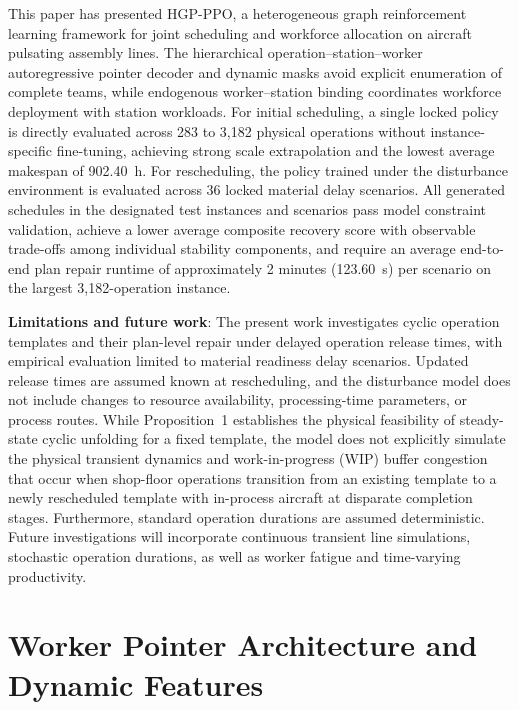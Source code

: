 \documentclass[journal,10pt]{IEEEtran}
\begin{document}
This paper has presented HGP-PPO, a heterogeneous graph reinforcement learning framework for joint scheduling and workforce allocation on aircraft pulsating assembly lines. The hierarchical operation--station--worker autoregressive pointer decoder and dynamic masks avoid explicit enumeration of complete teams, while endogenous worker--station binding coordinates workforce deployment with station workloads. For initial scheduling, a single locked policy is directly evaluated across 283 to 3,182 physical operations without instance-specific fine-tuning, achieving strong scale extrapolation and the lowest average makespan of 902.40~h. For rescheduling, the policy trained under the disturbance environment is evaluated across 36 locked material delay scenarios. All generated schedules in the designated test instances and scenarios pass model constraint validation, achieve a lower average composite recovery score with observable trade-offs among individual stability components, and require an average end-to-end plan repair runtime of approximately 2 minutes (123.60~s) per scenario on the largest 3,182-operation instance.

\textbf{Limitations and future work}: The present work investigates cyclic operation templates and their plan-level repair under delayed operation release times, with empirical evaluation limited to material readiness delay scenarios. Updated release times are assumed known at rescheduling, and the disturbance model does not include changes to resource availability, processing-time parameters, or process routes. While Proposition~1 establishes the physical feasibility of steady-state cyclic unfolding for a fixed template, the model does not explicitly simulate the physical transient dynamics and work-in-progress (WIP) buffer congestion that occur when shop-floor operations transition from an existing template to a newly rescheduled template with in-process aircraft at disparate completion stages. Furthermore, standard operation durations are assumed deterministic. Future investigations will incorporate continuous transient line simulations, stochastic operation durations, as well as worker fatigue and time-varying productivity.

\appendices

\section{Worker Pointer Architecture and Dynamic Features}\label{app:worker_pointer}
\end{document}

